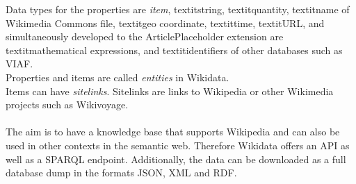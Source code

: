 Data types for the properties are \textit{item}, textit{string}, textit{quantity}, textit{name of Wikimedia Commons file}, textit{geo coordinate}, textit{time}, textit{URL}, and simultaneously developed to the ArticlePlaceholder extension are textit{mathematical expressions}, and textit{identifiers of other databases} such as VIAF. \\
Properties and items are called \textit{entities} in Wikidata. \\
Items can have \textit{sitelinks}. Sitelinks are links to Wikipedia or other Wikimedia projects such as Wikivoyage. \\
\\
The aim is to have a knowledge base that supports Wikipedia and can also be used in other contexts in the semantic web. Therefore Wikidata offers an API as well as a SPARQL endpoint. Additionally, the data can be downloaded as a full database dump in the formats JSON, XML and RDF. 